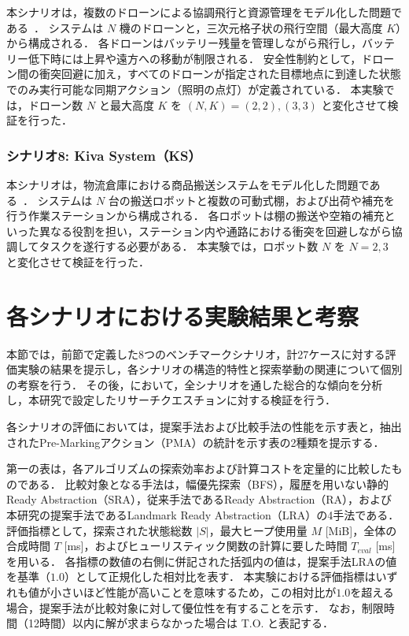\documentclass[a4paper,11pt,oneside,openany,report,dvipdfmx]{jsbook}
\newcommand\aref[1]{\hyperref[#1]{\prettyref{#1}}}
\begin{document}
本シナリオは，複数のドローンによる協調飛行と資源管理をモデル化した問題である~\cite{DroneCoordinationScenario}．
システムは $N$ 機のドローンと，三次元格子状の飛行空間（最大高度 $K$）から構成される．
各ドローンはバッテリー残量を管理しながら飛行し，バッテリー低下時には上昇や遠方への移動が制限される．
安全性制約として，ドローン間の衝突回避に加え，すべてのドローンが指定された目標地点に到達した状態でのみ実行可能な同期アクション（照明の点灯）が定義されている．
本実験では，ドローン数 $N$ と最大高度 $K$ を $(N, K) = (2, 2), (3, 3)$ と変化させて検証を行った．

\subsubsection{シナリオ8: Kiva System（KS）}

本シナリオは，物流倉庫における商品搬送システムをモデル化した問題である~\cite{KivaSystemScenario}．
システムは $N$ 台の搬送ロボットと複数の可動式棚，および出荷や補充を行う作業ステーションから構成される．
各ロボットは棚の搬送や空箱の補充といった異なる役割を担い，ステーション内や通路における衝突を回避しながら協調してタスクを遂行する必要がある．
本実験では，ロボット数 $N$ を $N = 2, 3$ と変化させて検証を行った．

\section{各シナリオにおける実験結果と考察}

本節では，前節で定義した8つのベンチマークシナリオ，計27ケースに対する評価実験の結果を提示し，各シナリオの構造的特性と探索挙動の関連について個別の考察を行う．
その後，\aref{sec:discussion}において，全シナリオを通した総合的な傾向を分析し，本研究で設定したリサーチクエスチョンに対する検証を行う．

各シナリオの評価においては，提案手法および比較手法の性能を示す表と，抽出されたPre-Markingアクション（PMA）の統計を示す表の2種類を提示する．

第一の表は，各アルゴリズムの探索効率および計算コストを定量的に比較したものである．
比較対象となる手法は，幅優先探索（BFS），履歴を用いない静的Ready Abstraction（SRA），従来手法であるReady Abstraction（RA），および本研究の提案手法であるLandmark Ready Abstraction（LRA）の4手法である．
評価指標として，探索された状態総数 $|S|$，最大ヒープ使用量 $M$ [MiB]，全体の合成時間 $T$ [ms]，およびヒューリスティック関数の計算に要した時間 $T_\mathit{eval}$ [ms] を用いる．
各指標の数値の右側に併記された括弧内の値は，提案手法LRAの値を基準（$1.0$）として正規化した相対比を表す．
本実験における評価指標はいずれも値が小さいほど性能が高いことを意味するため，この相対比が$1.0$を超える場合，提案手法が比較対象に対して優位性を有することを示す．
なお，制限時間（12時間）以内に解が求まらなかった場合は T.O. と表記する．
\end{document}
